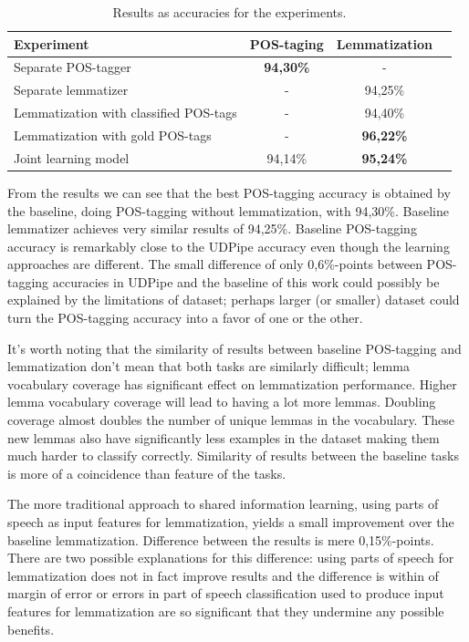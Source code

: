 \documentclass[12pt,a4paper,english
]{tutthesis}
\begin{document}
\begin{table}[htbp]
\caption{Results as accuracies for the experiments.}
\label{table:results}
\centering
\begin{tabular}{|l|c|c|l|}
  \hline
  Experiment & POS-taging & Lemmatization \\
  \hline
  \hline
  Separate POS-tagger & \textbf{94,30\%} & - \\
  Separate lemmatizer & - & 94,25\% \\
  Lemmatization with classified POS-tags & - & 94,40\% \\
  Lemmatization with gold POS-tags & - & \textbf{96,22\%} \\
  Joint learning model & 94,14\% & \textbf{95,24\%} \\
  \hline
\end{tabular}
\end{table}

From the results we can see that the best POS-tagging accuracy is obtained by the baseline, doing POS-tagging without lemmatization, with 94,30\%. Baseline lemmatizer achieves very similar results of 94,25\%. Baseline POS-tagging accuracy is remarkably close to the UDPipe accuracy even though the learning approaches are different. The small difference of only 0,6\%-points between POS-tagging accuracies in UDPipe and the baseline of this work could possibly be explained by the limitations of dataset; perhaps larger (or smaller) dataset could turn the POS-tagging accuracy into a favor of one or the other.

It's worth noting that the similarity of results between baseline POS-tagging and lemmatization don't mean that both tasks are similarly difficult; lemma vocabulary coverage has significant effect on lemmatization performance. Higher lemma vocabulary coverage will lead to having a lot more lemmas. Doubling coverage almost doubles the number of unique lemmas in the vocabulary. These new lemmas also have significantly less examples in the dataset making them much harder to classify correctly. Similarity of results between the baseline tasks is more of a coincidence than feature of the tasks.

The more traditional approach to shared information learning, using parts of speech as input features for lemmatization, yields a small improvement over the baseline lemmatization. Difference between the results is mere 0,15\%-points. There are two possible explanations for this difference: using parts of speech for lemmatization does not in fact improve results and the difference is within of margin of error or errors in part of speech classification used to produce input features for lemmatization are so significant that they undermine any possible benefits.
\end{document}
